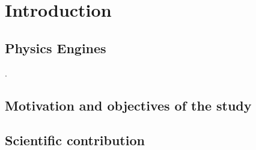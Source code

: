 \section{Introduction}

\subsection{Physics Engines}

\cite{Obrien:1999:GMA}. 

\subsection{Motivation and objectives of the study}

\subsection{Scientific contribution}


\cleardoublepage
